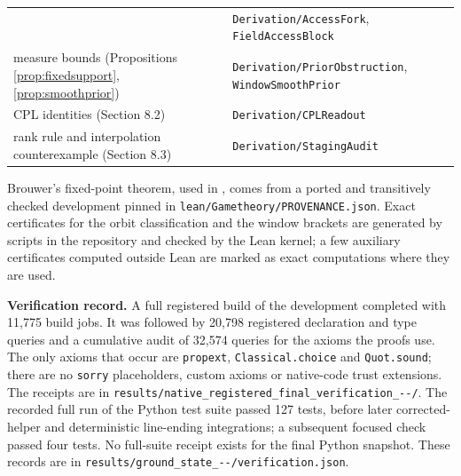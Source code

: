 \begin{longtable}[]{@{}ll@{}}
\begin{minipage}[t]{0.47\columnwidth}
\end{minipage} & \begin{minipage}[t]{0.47\columnwidth}\raggedright
\texttt{Derivation/\allowbreak AccessFork}, \texttt{FieldAccessBlock}\strut
\end{minipage}\tabularnewline
\begin{minipage}[t]{0.47\columnwidth}\raggedright
measure bounds (Propositions \ref{prop:fixedsupport},
\ref{prop:smoothprior})\strut
\end{minipage} & \begin{minipage}[t]{0.47\columnwidth}\raggedright
\texttt{Derivation/\allowbreak PriorObstruction}, \texttt{WindowSmoothPrior}\strut
\end{minipage}\tabularnewline
\begin{minipage}[t]{0.47\columnwidth}\raggedright
CPL identities (Section 8.2)\strut
\end{minipage} & \begin{minipage}[t]{0.47\columnwidth}\raggedright
\texttt{Derivation/\allowbreak CPLReadout}\strut
\end{minipage}\tabularnewline
\begin{minipage}[t]{0.47\columnwidth}\raggedright
rank rule and interpolation counterexample (Section 8.3)\strut
\end{minipage} & \begin{minipage}[t]{0.47\columnwidth}\raggedright
\texttt{Derivation/\allowbreak StagingAudit}\strut
\end{minipage}\tabularnewline
\bottomrule
\end{longtable}
\addtocounter{table}{-1}

Brouwer's fixed-point theorem, used in , comes from a
ported and transitively checked development pinned in
\texttt{lean/\allowbreak Gametheory/\allowbreak PROVENANCE.json}. Exact certificates for the
orbit classification and the window brackets are generated by scripts in
the repository and checked by the Lean kernel; a few auxiliary
certificates computed outside Lean are marked as exact computations
where they are used.

\textbf{Verification record.} A full registered build of the development
completed with 11,775 build jobs. It was followed by 20,798 registered
declaration and type queries and a cumulative audit of 32,574 queries
for the axioms the proofs use. The only axioms that occur are
\texttt{propext}, \texttt{Classical.choice} and \texttt{Quot.sound};
there are no \texttt{sorry} placeholders, custom axioms or native-code
trust extensions. The receipts are in
\texttt{results/\allowbreak native\_\allowbreak registered\_\allowbreak final\_\allowbreak verification\_--/\allowbreak }.
The recorded full run of the Python test suite passed 127 tests, before
later corrected-helper and deterministic line-ending integrations; a
subsequent focused check passed four tests. No full-suite receipt exists
for the final Python snapshot. These records are in
\texttt{results/\allowbreak ground\_\allowbreak state\_--/\allowbreak verification.json}.

